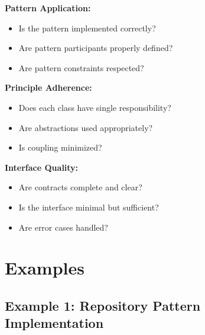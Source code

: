 \documentclass[11pt,letterpaper]{article}
\begin{document}
\begin{definitionbox}
\textbf{Pattern Application:}
\begin{itemize}[nosep]
    \item Is the pattern implemented correctly?
    \item Are pattern participants properly defined?
    \item Are pattern constraints respected?
\end{itemize}

\textbf{Principle Adherence:}
\begin{itemize}[nosep]
    \item Does each class have single responsibility?
    \item Are abstractions used appropriately?
    \item Is coupling minimized?
\end{itemize}

\textbf{Interface Quality:}
\begin{itemize}[nosep]
    \item Are contracts complete and clear?
    \item Is the interface minimal but sufficient?
    \item Are error cases handled?
\end{itemize}
\end{definitionbox}

\section{Examples}

\subsection{Example 1: Repository Pattern Implementation}
\end{document}
